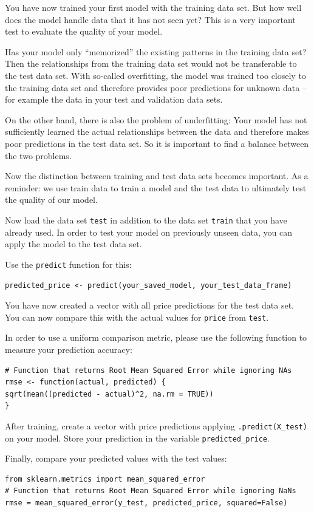 \documentclass[
  11pt,
]{article}
\newenvironment{tips}[1]
  {
  \begin{itemize}
  \footnotesize
  \renewcommand{\labelitemi}{
    \raisebox{-.7\height}[0pt][0pt]{
      {\setkeys{Gin}{width=3em,keepaspectratio}
        \texttt{[image: images/\#1.png]}}
    }
  }
  \setlength{\fboxsep}{1em}
  \begin{rbox}
  \item
  }
  {
  \end{rbox}
  \end{itemize}
  }
\newenvironment{tipsp}[1]
  {
  \begin{itemize}
  \footnotesize
  \renewcommand{\labelitemi}{
    \raisebox{-.7\height}[0pt][0pt]{
      {\setkeys{Gin}{width=3em,keepaspectratio}
        \texttt{[image: images/\#1.png]}}
    }
  }
  \setlength{\fboxsep}{1em}
  \begin{pbox}
  \item
  }
  {
  \end{pbox}
  \end{itemize}
  }
\begin{document}
You have now trained your first model with the training data set. But how well does the model handle data that it has not seen yet? This is a very important test to evaluate the quality of your model.

Has your model only ``memorized'' the existing patterns in the training data set?
Then the relationships from the training data set would not be transferable to the test data set. With so-called overfitting, the model was trained too closely to the training data set and therefore provides poor predictions for unknown data -- for example the data in your test and validation data sets.

On the other hand, there is also the problem of underfitting: Your model has not sufficiently learned the actual relationships between the data and therefore makes poor predictions in the test data set. So it is important to find a balance between the two problems.

Now the distinction between training and test data sets becomes important. As a reminder: we use train data to train a model and the test data to ultimately test the quality of our model.

Now load the data set \texttt{test} in addition to the data set \texttt{train} that you have already used. In order to test your model on previously unseen data, you can apply the model to the test data set.

\begin{tips}r

Use the \texttt{predict} function for this:

\texttt{predicted\_price\ \textless{}-\ predict(your\_saved\_model,\ your\_test\_data\_frame)}

You have now created a vector with all price predictions for the test data set. You can now compare this with the actual values for \texttt{price} from \texttt{test}.

In order to use a uniform comparison metric, please use the following function to measure your prediction accuracy:

\begin{verbatim}
# Function that returns Root Mean Squared Error while ignoring NAs
rmse <- function(actual, predicted) {
sqrt(mean((predicted - actual)^2, na.rm = TRUE))
}
\end{verbatim}

\end{tips}

\begin{tipsp}p

After training, create a vector with price predictions applying \texttt{.predict(X\_test)} on your model. Store your prediction in the variable \texttt{predicted\_price}.

Finally, compare your predicted values with the test values:

\begin{verbatim}
from sklearn.metrics import mean_squared_error
# Function that returns Root Mean Squared Error while ignoring NaNs
rmse = mean_squared_error(y_test, predicted_price, squared=False)
\end{verbatim}

\end{tipsp}
\end{document}
